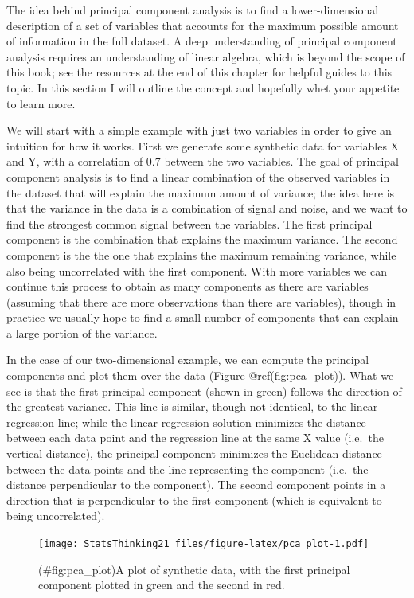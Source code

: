 \documentclass[
  12pt,
]{book}
\begin{document}
The idea behind principal component analysis is to find a lower-dimensional description of a set of variables that accounts for the maximum possible amount of information in the full dataset. A deep understanding of principal component analysis requires an understanding of linear algebra, which is beyond the scope of this book; see the resources at the end of this chapter for helpful guides to this topic. In this section I will outline the concept and hopefully whet your appetite to learn more.

We will start with a simple example with just two variables in order to give an intuition for how it works. First we generate some synthetic data for variables X and Y, with a correlation of 0.7 between the two variables. The goal of principal component analysis is to find a linear combination of the observed variables in the dataset that will explain the maximum amount of variance; the idea here is that the variance in the data is a combination of signal and noise, and we want to find the strongest common signal between the variables. The first principal component is the combination that explains the maximum variance. The second component is the the one that explains the maximum remaining variance, while also being uncorrelated with the first component. With more variables we can continue this process to obtain as many components as there are variables (assuming that there are more observations than there are variables), though in practice we usually hope to find a small number of components that can explain a large portion of the variance.

In the case of our two-dimensional example, we can compute the principal components and plot them over the data (Figure @ref(fig:pca\_plot)). What we see is that the first principal component (shown in green) follows the direction of the greatest variance. This line is similar, though not identical, to the linear regression line; while the linear regression solution minimizes the distance between each data point and the regression line at the same X value (i.e.~the vertical distance), the principal component minimizes the Euclidean distance between the data points and the line representing the component (i.e.~the distance perpendicular to the component). The second component points in a direction that is perpendicular to the first component (which is equivalent to being uncorrelated).

\begin{figure}
\centering
\texttt{[image: StatsThinking21\_files/figure-latex/pca\_plot-1.pdf]}
\caption{(\#fig:pca\_plot)A plot of synthetic data, with the first principal component plotted in green and the second in red.}
\end{figure}
\end{document}
